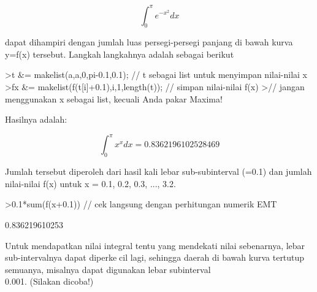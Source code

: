 \documentclass[12pt,arial,letterpaper]{book}
\begin{document}
\begin{eulernootebook}
\begin{eulercomment}
\begin{eulercomment}
\begin{eulernootebook}
\begin{eulercomment}
\begin{eulercomment}
\begin{eulercomment}
\begin{eulercomment}
\begin{eulercomment}
\begin{eulercomment}
\begin{eulernotebook}
\begin{eulercomment}
\begin{eulercomment}
\begin{eulercomment}
\begin{eulercomment}
\begin{eulercomment}
\begin{eulercomment}
\begin{eulercomment}
\begin{eulercomment}
\begin{eulercomment}
\end{eulercomment}
\begin{eulerformula}
\[
\int_{0}^{\pi}e^{-x^2}dx
\]
\end{eulerformula}
\begin{eulercomment}
dapat dihampiri dengan jumlah luas persegi-persegi panjang di bawah
kurva y=f(x) tersebut. Langkahlangkahnya adalah sebagai berikut
\end{eulercomment}
\begin{eulerprompt}
>t &= makelist(a,a,0,pi-0.1,0.1); // t sebagai list untuk menyimpan nilai-nilai x
>fx &= makelist(f(t[i]+0.1),i,1,length(t)); // simpan nilai-nilai f(x)
>// jangan menggunakan x sebagai list, kecuali Anda pakar Maxima!
\end{eulerprompt}
\begin{eulercomment}
Hasilnya adalah:

\end{eulercomment}
\begin{eulerformula}
\[
\int_{0}^{\pi}x^x dx=0.8362196102528469
\]
\end{eulerformula}
\begin{eulercomment}
Jumlah tersebut diperoleh dari hasil kali lebar sub-subinterval (=0.1)
dan jumlah nilai-nilai f(x) untuk x = 0.1, 0.2, 0.3, ..., 3.2.
\end{eulercomment}
\begin{eulerprompt}
>0.1*sum(f(x+0.1)) // cek langsung dengan perhitungan numerik EMT
\end{eulerprompt}
\begin{euleroutput}
  0.836219610253
\end{euleroutput}
\begin{eulercomment}
Untuk mendapatkan nilai integral tentu yang mendekati nilai
sebenarnya, lebar sub-intervalnya dapat diperkecil lagi, sehingga
daerah di bawah kurva tertutup semuanya, misalnya dapat digunakan
lebar subinterval\\
0.001. (Silakan dicoba!)


\end{eulercomment}
\end{eulercomment}
\end{eulercomment}
\end{eulercomment}
\end{eulercomment}
\end{eulercomment}
\end{eulercomment}
\end{eulercomment}
\end{eulercomment}
\end{eulernotebook}
\end{eulercomment}
\end{eulercomment}
\end{eulercomment}
\end{eulercomment}
\end{eulercomment}
\end{eulercomment}
\end{eulernootebook}
\end{eulercomment}
\end{eulercomment}
\end{eulernootebook}
\end{document}

